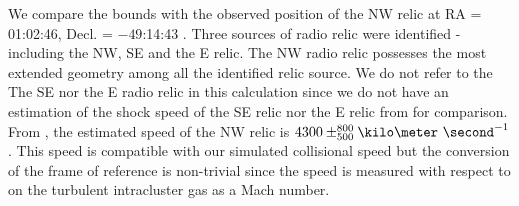 We compare the bounds with the observed position of the NW relic  at RA =
01:02:46, Decl. = $-49$:14:43 \citep{L13}.
Three sources of radio relic
were identified - including the NW, SE and the E relic. The NW radio
relic possesses the most extended geometry among all the identified relic source. 
We do not refer to the The SE nor the E radio relic in this calculation
since we do not have an estimation of the shock speed of the SE relic
nor the E relic from \citealt{L13} for comparison.    
From \citet{L13}, the estimated speed of the NW relic is $4300 \pm
^{800}_{500}\kilo\meter~\second^{-1}$. This speed is compatible with our
simulated collisional speed but the conversion of the frame of reference is
non-trivial since the speed is measured with respect to on the turbulent
intracluster gas as a Mach number.






%
%
%

